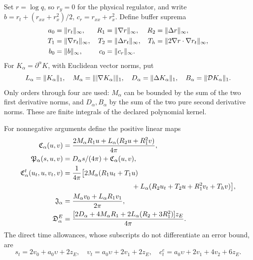 Set $r=\log q$, so $r_y=0$ for the physical regulator, and write
$b=r_t+(r_{xx}+r_x^2)/2$, $c_r=r_{xx}+r_x^2$. Define buffer suprema
\begin{align}
 a_0&=\|r_t\|_\infty,& R_1&=\|\nabla r\|_\infty,&R_2&=\|\Delta r\|_\infty,\notag\\
 T_1&=\|\nabla r_t\|_\infty,&T_2&=\|\Delta r_t\|_\infty,
 &T_h&=\|2\nabla r\cdot\nabla r_t\|_\infty,\notag\\
 b_0&=\|b\|_\infty,&c_0&=\|c_r\|_\infty.
 \label{eq:cj-regulator-caps}
\end{align}
For $K_\alpha=\partial^\alpha K$, with Euclidean vector norms, put
\begin{equation}
 L_\alpha=\|K_\alpha\|_1,\quad
 M_\alpha=\||\nabla K_\alpha|\|_1,\quad
 D_\alpha=\|\Delta K_\alpha\|_1,\quad
 B_\alpha=\|\mathcal D K_\alpha\|_1.
 \label{eq:cj-kernel-caps}
\end{equation}
Only orders through four are used: $M_\alpha$ can be bounded by the sum
of the two first derivative norms, and $D_\alpha,B_\alpha$ by the sum
of the two pure second derivative norms. These are finite integrals of
the declared polynomial kernel.

For nonnegative arguments define the positive linear maps
\begin{align}
 \mathfrak C_\alpha(u,v)
 &=\frac{2M_\alpha R_1u+L_\alpha(R_2u+R_1^2v)}{4\pi},\notag\\
 \mathfrak P_\alpha(s,u,v)&=D_\alpha s/(4\pi)+\mathfrak C_\alpha(u,v),
 \label{eq:cj-static-maps}\\
 \mathfrak C^t_\alpha(u_t,u,v_t,v)
 &=\frac{1}{4\pi}\bigl[2M_\alpha(R_1u_t+T_1u)\notag\\
 &\hspace{35mm}+L_\alpha(R_2u_t+T_2u+R_1^2v_t+T_hv)\bigr],
 \label{eq:cj-time-map}\\
 \mathfrak J_\alpha&=\frac{M_\alpha v_0+L_\alpha R_1v_1}{2\pi},\notag\\
 \mathfrak D^E_\alpha
 &=\frac{[2D_\alpha+4M_\alpha R_1+2L_\alpha(R_2+3R_1^2)]z_E}{4\pi}.
 \label{eq:cj-current-map}
\end{align}
The direct time allowances, whose subscripts do not differentiate an
error bound, are
\begin{equation}
 s_t=2v_0+a_0\upsilon+2z_E,\quad
 \upsilon_t=a_0\upsilon+2v_1+2z_E,\quad
 c_t^e=a_0\upsilon+2v_1+4v_2+6z_E.
 \label{eq:cj-time-errors}
\end{equation}

